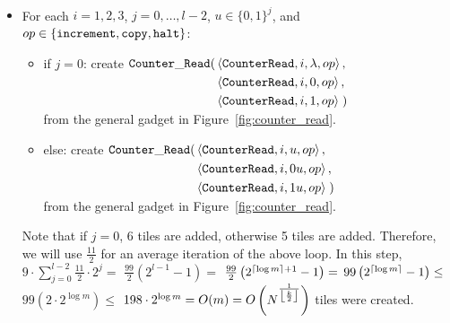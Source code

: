 \subsubsection{\cread}

\begin{itemize}
    \item For each $i = 1,2,3$,
                   $j = 0,\ldots,l-2$,
                   $u \in \{0, 1\}^j$, and
                   $\inc \in \ops$:
    \begin{itemize}
        \item if $j = 0$:
        create
        $\begin{aligned}[t]
            \cread(& \left\langle {\tt CounterRead}, i, \lambda, \inc \right\rangle, \\
                   & \left\langle {\tt CounterRead}, i, 0,       \inc \right\rangle, \\
                   & \left\langle {\tt CounterRead}, i, 1,       \inc \right\rangle \;)
        \end{aligned}$\\ from the general gadget in Figure~\ref{fig:counter_read}.

        \item else:
        create $\begin{aligned}[t]
        \cread(& \left\langle {\tt CounterRead}, i, u,  \inc \right\rangle, \\
               & \left\langle {\tt CounterRead}, i, 0u, \inc \right\rangle, \\
               & \left\langle {\tt CounterRead}, i, 1u, \inc \right\rangle \;)
        \end{aligned}$\\ from the general gadget in Figure~\ref{fig:counter_read}.
    \end{itemize}
    Note that if $j = 0$, 6 tiles are added, otherwise 5 tiles are added.
    Therefore, we will use $\frac{11}{2}$ for an average iteration of the above loop.
    In this step,
    $9 \cdot \sum_{j=0}^{l - 2} \frac{11}{2} \cdot 2^j = $
    $\frac{99}{2} \left( 2^{l - 1} - 1 \right) = $
    $\frac{99}{2} \left( 2^{\ceil*{\log m} + 1} - 1 \right) = $
    $99 \left( 2^{\ceil*{\log m}} - 1 \right) \leq$
    $99 \left( 2 \cdot 2^{\log m} \right) \leq$
    $198 \cdot 2^{\log m} = O(m) = O\left( \upperbound \right)$ tiles were created.

\end{itemize}

